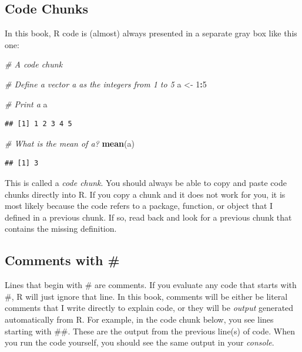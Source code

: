 \documentclass[
]{book}
\newenvironment{Shaded}{\begin{snugshade}}{\end{snugshade}}
\newcommand{\CommentTok}[1]{\textcolor[rgb]{0.56,0.35,0.01}{\textit{#1}}}
\newcommand{\DecValTok}[1]{\textcolor[rgb]{0.00,0.00,0.81}{#1}}
\newcommand{\KeywordTok}[1]{\textcolor[rgb]{0.13,0.29,0.53}{\textbf{#1}}}
\newcommand{\NormalTok}[1]{#1}
\newcommand{\OperatorTok}[1]{\textcolor[rgb]{0.81,0.36,0.00}{\textbf{#1}}}
\newcommand{\StringTok}[1]{\textcolor[rgb]{0.31,0.60,0.02}{#1}}
\begin{document}
\hypertarget{code-chunks}{%
\subsection{Code Chunks}\label{code-chunks}}

In this book, R code is (almost) always presented in a separate gray box like this one:

\begin{Shaded}
\begin{Highlighting}[]
\CommentTok{# A code chunk}

\CommentTok{# Define a vector a as the integers from 1 to 5}
\NormalTok{a <-}\StringTok{ }\DecValTok{1}\OperatorTok{:}\DecValTok{5}

\CommentTok{# Print a}
\NormalTok{a}
\end{Highlighting}
\end{Shaded}

\begin{verbatim}
## [1] 1 2 3 4 5
\end{verbatim}

\begin{Shaded}
\begin{Highlighting}[]
\CommentTok{# What is the mean of a?}
\KeywordTok{mean}\NormalTok{(a)}
\end{Highlighting}
\end{Shaded}

\begin{verbatim}
## [1] 3
\end{verbatim}

This is called a \emph{code chunk}. You should always be able to copy and paste code chunks directly into R. If you copy a chunk and it does not work for you, it is most likely because the code refers to a package, function, or object that I defined in a previous chunk. If so, read back and look for a previous chunk that contains the missing definition.

\hypertarget{comments-with}{%
\subsection{Comments with \#}\label{comments-with}}

Lines that begin with \# are comments. If you evaluate any code that starts with \#, R will just ignore that line. In this book, comments will be either be literal comments that I write directly to explain code, or they will be \emph{output} generated automatically from R. For example, in the code chunk below, you see lines starting with \#\#. These are the output from the previous line(s) of code. When you run the code yourself, you should see the same output in your \emph{console}.
\end{document}
